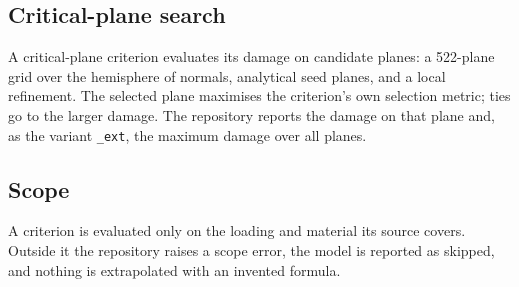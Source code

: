 \subsection{Critical-plane search}\label{sec:planes}

A critical-plane criterion evaluates its damage on candidate planes: a 522-plane grid over the
hemisphere of normals, analytical seed planes, and a local refinement. The selected plane maximises
the criterion's own selection metric; ties go to the larger damage. The repository reports the
damage on that plane and, as the variant \texttt{\_ext}, the maximum damage over all planes.

\subsection{Scope}

A criterion is evaluated only on the loading and material its source covers. Outside it the
repository raises a scope error, the model is reported as skipped, and nothing is extrapolated
with an invented formula.
